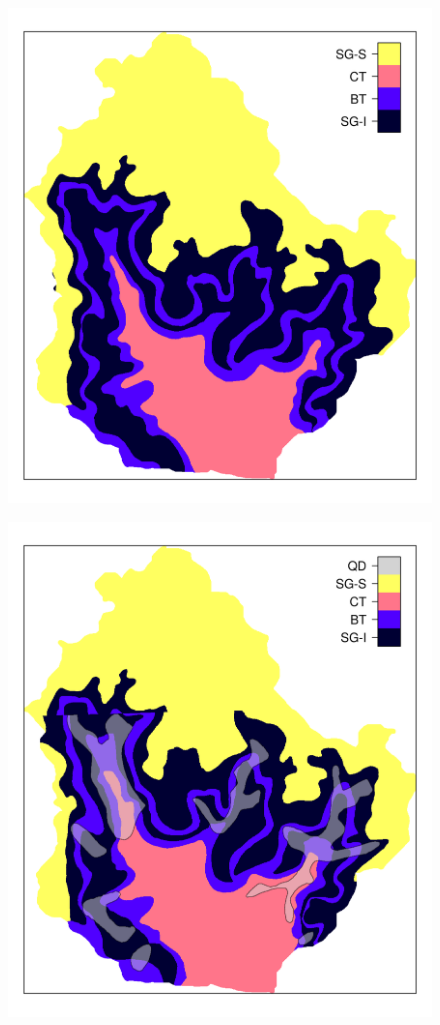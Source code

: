 \begin{figure}[!ht]
\centering
\begin{minipage}[b]{0.45\textwidth}
\subcaption{}
\label{fig:chap05-geo-old}
\centering
\includegraphics[width = \textwidth]{fig/chap05-geo-old}
\end{minipage}
\begin{minipage}[b]{0.45\textwidth}
\subcaption{}
\label{fig:chap05-geo-new}
\centering
\includegraphics[width = \textwidth]{fig/chap05-geo-new}

\end{minipage}
\end{figure}
